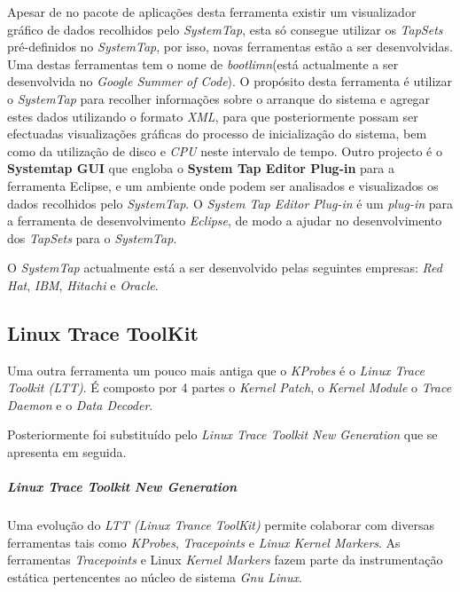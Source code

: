 Apesar de no pacote de aplicações desta ferramenta existir um visualizador gráfico de dados recolhidos pelo \textit{SystemTap}, esta só consegue utilizar os \textit{TapSets} pré-definidos no \textit{SystemTap}, por isso, novas ferramentas estão a ser desenvolvidas. Uma destas ferramentas tem o nome de \textit{bootlimn}(está actualmente a ser desenvolvida no \textit{Google Summer of Code}).  O propósito desta ferramenta é utilizar o \textit{SystemTap} para recolher informações sobre o arranque do sistema e agregar estes dados utilizando o formato \textit{XML}, para que posteriormente possam ser efectuadas visualizações gráficas do processo de inicialização do sistema, bem como da utilização de disco e \textit{CPU} neste intervalo de tempo. Outro projecto é o \textbf{Systemtap GUI} que engloba o \textbf{System Tap Editor Plug-in} para a ferramenta Eclipse, e um ambiente onde podem ser analisados e visualizados os dados recolhidos pelo \textit{SystemTap}.
O \textit{System Tap Editor Plug-in} é um \textit{plug-in} para a ferramenta de desenvolvimento \textit{Eclipse}, de modo a ajudar no desenvolvimento dos \textit{TapSets} para o \textit{SystemTap}.

O \textit{SystemTap} actualmente está a ser desenvolvido pelas seguintes empresas: \textit{Red Hat}, \textit{IBM}, \textit{Hitachi} e \textit{Oracle}.

\subsection{Linux Trace ToolKit}\label{cap:linux_trace_toolkit_overview}

Uma outra ferramenta um pouco mais antiga que o \textit{KProbes} é o \textit{Linux Trace Toolkit (LTT)}. É composto por 4 partes o \textit{Kernel Patch}, o \textit{Kernel Module} o \textit{Trace Daemon} e o \textit{Data Decoder}.

Posteriormente foi substituído pelo \textit{Linux Trace Toolkit New Generation} que se apresenta em seguida.

\subparagraph{Linux Trace Toolkit New Generation}\label{cap:lttng_overview}


Uma evolução do \textit{LTT (Linux Trance ToolKit)} permite colaborar com diversas ferramentas tais como \textit{KProbes}, \textit{Tracepoints}\cite{Mathieu2009} e \textit{Linux Kernel Markers}\cite{Mathieu2009}. As ferramentas \textit{Tracepoints} e Linux \textit{Kernel Markers} fazem parte da instrumentação estática pertencentes ao núcleo de sistema \textit{Gnu Linux}.

